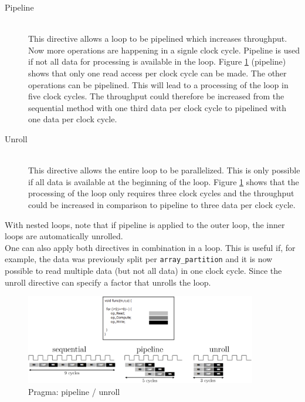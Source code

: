 \begin{description}
\item[Pipeline]\hfill \\
This directive allows a loop to be pipelined which increases throughput.
Now more operations are happening in a signle clock cycle.
Pipeline is used if not all data for processing is available in the loop. Figure
\ref{fig:p_pipeline_unroll} (pipeline) shows that only one read access per clock cycle can be made. The other operations can be pipelined. This will lead to a processing of the loop in five clock cycles. The throughput could therefore be increased from the sequential method with one third data per clock cycle to pipelined with one data per clock cycle.

\item[Unroll]\hfill \\ 
This directive allows the entire loop to be parallelized. This is only possible if all data is available at the beginning of the loop. Figure \ref{fig:p_pipeline_unroll} shows that the processing of the loop only requires three clock cycles and the throughput could be increased in comparison to pipeline to three data per clock cycle.
\end{description}

With nested loops, note that if pipeline is applied to the outer loop, the inner
loops are automatically unrolled. \\
One can also apply both directives in combination in a loop. This is useful if,
for example, the data was previously split per \texttt{array\_partition} and it is now possible to read multiple data (but not all data) in one clock cycle. Since the unroll directive can specify a factor that unrolls the loop.

\begin{figure}[tb!]
    \centering
    \includegraphics[width=0.9\textwidth]{images/theory/pipeline_unroll.png}
    \caption{Pragma: pipeline / unroll}
    \label{fig:p_pipeline_unroll}
\end{figure}

